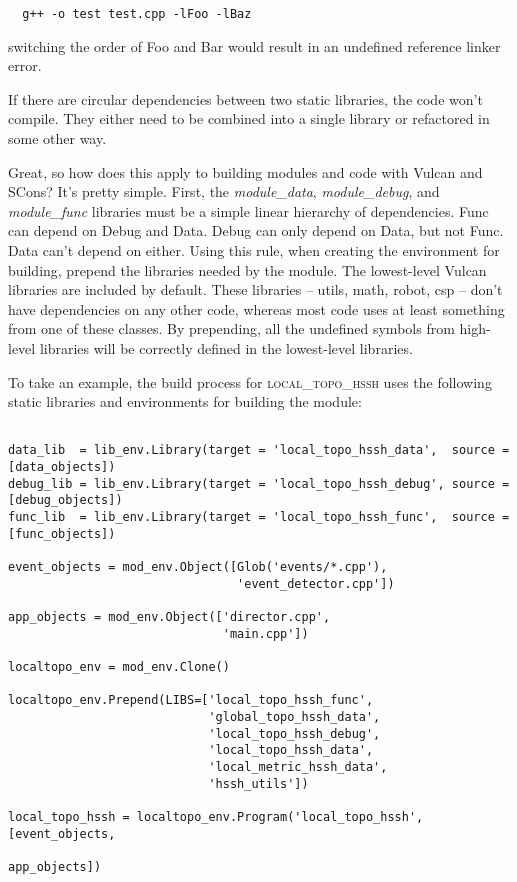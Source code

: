 \documentclass{article}
\begin{document}
\begin{verbatim}
  g++ -o test test.cpp -lFoo -lBaz
\end{verbatim}

switching the order of Foo and Bar would result in an undefined reference linker error.

If there are circular dependencies between two static libraries, the code won't compile. They either need to be combined 
into a single library or refactored in some other way.

Great, so how does this apply to building modules and code with Vulcan and SCons? It's pretty simple. First, the 
\emph{module\_data}, \emph{module\_debug}, and \emph{module\_func} libraries must be a simple linear hierarchy of 
dependencies. Func can depend on Debug and Data. Debug can only depend on Data, but not Func. Data can't depend on 
either. Using this rule, when creating the environment for building, prepend the libraries needed by the module. The 
lowest-level Vulcan libraries are included by default. These libraries -- utils, math, robot, csp -- don't have 
dependencies on any other code, whereas most code uses at least something from one of these classes. By prepending, all 
the undefined symbols from high-level libraries will be correctly defined in the lowest-level libraries.

To take an example, the build process for \textsc{local\_topo\_hssh} uses the following static libraries and 
environments for building the module:

\begin{verbatim}

data_lib  = lib_env.Library(target = 'local_topo_hssh_data',  source = [data_objects])
debug_lib = lib_env.Library(target = 'local_topo_hssh_debug', source = [debug_objects])
func_lib  = lib_env.Library(target = 'local_topo_hssh_func',  source = [func_objects])

event_objects = mod_env.Object([Glob('events/*.cpp'),
                                'event_detector.cpp'])

app_objects = mod_env.Object(['director.cpp',
                              'main.cpp'])

localtopo_env = mod_env.Clone()

localtopo_env.Prepend(LIBS=['local_topo_hssh_func', 
                            'global_topo_hssh_data', 
                            'local_topo_hssh_debug', 
                            'local_topo_hssh_data', 
                            'local_metric_hssh_data', 
                            'hssh_utils'])
                            
local_topo_hssh = localtopo_env.Program('local_topo_hssh', [event_objects,
                                                            app_objects])
 
\end{verbatim}
\end{document}
